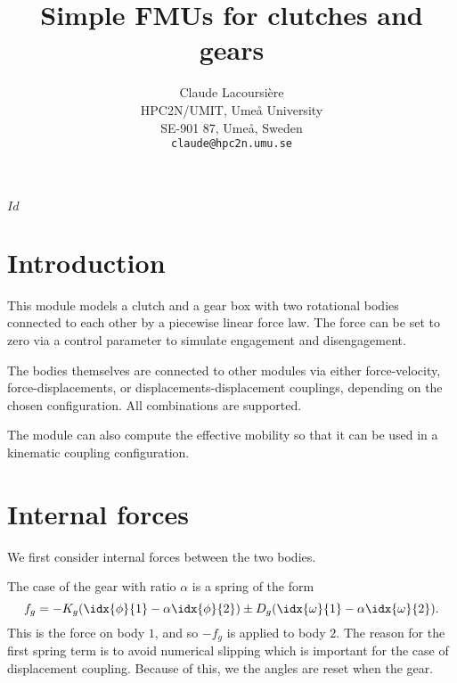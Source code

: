 \documentclass[10pt,notitlepage,abstracton]{scrartcl}
\title{Simple FMUs for clutches and gears}
\author{Claude Lacoursi{\`{e}}re \\
  HPC2N/UMIT, Ume{\aa} University\\
  SE-901 87, Ume{\aa}, Sweden\\
  \texttt{claude@hpc2n.umu.se}
}
\theoremstyle{plain}
\theoremstyle{plain}
\theoremstyle{plain}
\begin{document}
\svnInfo $Id$
\maketitle{}
\svnId
\begin{abstract}

\end{abstract}

\section{Introduction}
\label{sec:introduction}

This module models a clutch and a gear box with two rotational bodies
connected to each other by a piecewise linear force law.  The force can be
set to zero via a control parameter to simulate engagement and
disengagement.

The bodies themselves are connected to other modules via either
force-velocity, force-displacements, or displacements-displacement
couplings, depending on the chosen configuration.  All combinations are
supported.

The module can also compute the effective mobility so that it can be used
in a kinematic coupling configuration. 

\section{Internal forces}
\label{sec:internal}

We first consider internal forces between the two bodies.   

The case of the
gear with ratio $\alpha$ is a spring of the form
\begin{equation}
  \label{eq:1}
  f_{g} = 
  - K_{g}(\idx{\phi}{1} - \alpha\idx{\phi}{2})
\pm D_{g}(\idx{\omega}{1}  - \alpha\idx{\omega}{2}).
\end{equation}
This is the force on body $1$, and so $-f_{g}$ is applied to body $2$.
The reason for the first spring term is to avoid numerical slipping which
is important for the case of displacement coupling.  Because of this, we
the angles are reset when the gear.  
\end{document}
